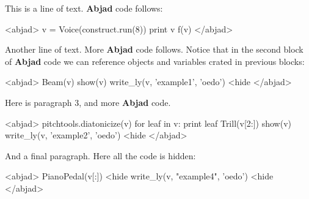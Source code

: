 \documentclass[11pt]{article}
\begin{document}
This is a line of text. \textbf{Abjad} code follows:

<abjad>
v = Voice(construct.run(8))
print v
f(v)
</abjad>

Another line of text. More \textbf{Abjad} code follows. Notice that in the second block of \textbf{Abjad} code we can reference objects and variables crated in previous blocks:

<abjad>
Beam(v)
show(v)
write_ly(v, 'example1', 'oedo') <hide
</abjad>

Here is paragraph 3, and more \textbf{Abjad} code.

<abjad>
pitchtools.diatonicize(v)
for leaf in v: print leaf
Trill(v[2:])
show(v)
write_ly(v, 'example2', 'oedo') <hide
</abjad>

And a final paragraph. Here all the code is hidden:

<abjad>
PianoPedal(v[:]) <hide
write_ly(v, "example4", 'oedo') <hide
</abjad>
\end{document}
